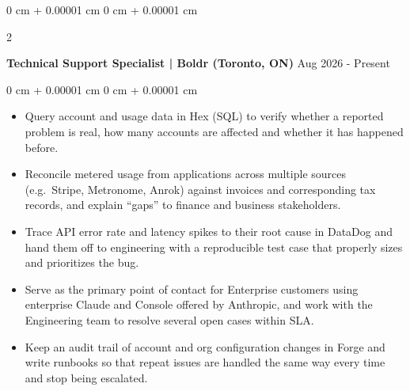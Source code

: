 \documentclass[10pt, letterpaper]{article}
\newenvironment{highlights}{
    \begin{itemize}[
        topsep=0.10 cm,
        parsep=0.10 cm,
        partopsep=0pt,
        itemsep=0pt,
        leftmargin=0 cm + 10pt
    ]
}{
    \end{itemize}
} %
\newenvironment{onecolentry}{
    \begin{adjustwidth}{
        0 cm + 0.00001 cm
    }{
        0 cm + 0.00001 cm
    }
}{
    \end{adjustwidth}
} %
\newenvironment{twocolentry}[2][]{
    \onecolentry
    \def\secondColumn{#2}
    \setcolumnwidth{\fill, 4.5 cm}
    \begin{paracol}{2}
}{
    \switchcolumn \raggedleft \secondColumn
    \end{paracol}
    \endonecolentry
} %
\begin{document}
        \begin{twocolentry}{
            {Aug 2026 - Present}
        }
            \textbf{Technical Support Specialist | Boldr (Toronto, ON)}\end{twocolentry}
        \vspace{0.10 cm}
        \begin{onecolentry}
            \begin{highlights}
                \item Query account and usage data in Hex (SQL) to verify whether a reported problem is real, how many accounts are affected and whether it has happened before.
                \item Reconcile metered usage from applications across multiple sources (e.g.\ Stripe, Metronome, Anrok) against invoices and corresponding tax records, and explain ``gaps'' to finance and business stakeholders.
                \item Trace API error rate and latency spikes to their root cause in DataDog and hand them off to engineering with a reproducible test case that properly sizes and prioritizes the bug.
                \item Serve as the primary point of contact for Enterprise customers using enterprise Claude and Console offered by Anthropic, and work with the Engineering team to resolve several open cases within SLA.
                \item Keep an audit trail of account and org configuration changes in Forge and write runbooks so that repeat issues are handled the same way every time and stop being escalated.
            \end{highlights}
        \end{onecolentry}
\end{document}
